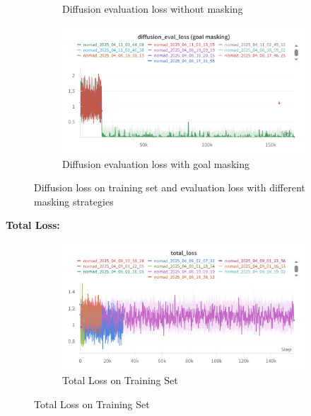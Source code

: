 \documentclass[12pt]{article}
\begin{document}
\begin{figure}[H]
\begin{subfigure}[H]{0.48\textwidth}
        \caption{Diffusion evaluation loss without masking}
        \label{fig:diffusion_eval_loss_no_masking}
    \end{subfigure}
    \hfill
    \begin{subfigure}[H]{0.48\textwidth}
        \centering
        \includegraphics[width=\textwidth]{images/diffusion_eval_loss_goal_masking.png}
        \caption{Diffusion evaluation loss with goal masking}
        \label{fig:diffusion_eval_loss_goal_masking}
    \end{subfigure}
    \caption{Diffusion loss on training set and evaluation loss with different masking strategies}
    \end{figure}
\noindent \textbf{Total Loss:}\\
\begin{figure}[H]
    \centering
    \begin{subfigure}[b]{0.48\textwidth}
        \centering
        \includegraphics[width=\textwidth]{images/total_loss.png}
        \caption{Total Loss on Training Set}
        \label{fig:total_loss}
    \end{subfigure}
    \end{figure}
\
\end{document}
